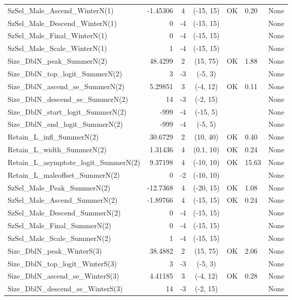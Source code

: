 \documentclass[12pt,]{article}
\begin{document}
\begin{landscape}
\begin{longtable}{lrcccll}
  SzSel\_Male\_Ascend\_WinterN(1) & -1.45306 & 4 & (-15, 15) & OK & 0.20 & None \\ 
  SzSel\_Male\_Descend\_WinterN(1) & 0 & -4 & (-15, 15) &  &  & None \\ 
  SzSel\_Male\_Final\_WinterN(1) & 0 & -4 & (-15, 15) &  &  & None \\ 
  SzSel\_Male\_Scale\_WinterN(1) & 1 & -4 & (-15, 15) &  &  & None \\ 
  Size\_DblN\_peak\_SummerN(2) & 48.4299 & 2 & (15, 75) & OK & 1.88 & None \\ 
  Size\_DblN\_top\_logit\_SummerN(2) & 3 & -3 & (-5, 3) &  &  & None \\ 
  Size\_DblN\_ascend\_se\_SummerN(2) & 5.29851 & 3 & (-4, 12) & OK & 0.11 & None \\ 
  Size\_DblN\_descend\_se\_SummerN(2) & 14 & -3 & (-2, 15) &  &  & None \\ 
  Size\_DblN\_start\_logit\_SummerN(2) & -999 & -4 & (-15, 5) &  &  & None \\ 
  Size\_DblN\_end\_logit\_SummerN(2) & -999 & -4 & (-5, 5) &  &  & None \\ 
  Retain\_L\_infl\_SummerN(2) & 30.6729 & 2 & (10, 40) & OK & 0.40 & None \\ 
  Retain\_L\_width\_SummerN(2) & 1.31436 & 4 & (0.1, 10) & OK & 0.24 & None \\ 
  Retain\_L\_asymptote\_logit\_SummerN(2) & 9.37198 & 4 & (-10, 10) & OK & 15.63 & None \\ 
  Retain\_L\_maleoffset\_SummerN(2) & 0 & -2 & (-10, 10) &  &  & None \\ 
  SzSel\_Male\_Peak\_SummerN(2) & -12.7368 & 4 & (-20, 15) & OK & 1.08 & None \\ 
  SzSel\_Male\_Ascend\_SummerN(2) & -1.89766 & 4 & (-15, 15) & OK & 0.24 & None \\ 
  SzSel\_Male\_Descend\_SummerN(2) & 0 & -4 & (-15, 15) &  &  & None \\ 
  SzSel\_Male\_Final\_SummerN(2) & 0 & -4 & (-15, 15) &  &  & None \\ 
  SzSel\_Male\_Scale\_SummerN(2) & 1 & -4 & (-15, 15) &  &  & None \\ 
  Size\_DblN\_peak\_WinterS(3) & 38.4882 & 2 & (15, 75) & OK & 2.06 & None \\ 
  Size\_DblN\_top\_logit\_WinterS(3) & 3 & -3 & (-5, 3) &  &  & None \\ 
  Size\_DblN\_ascend\_se\_WinterS(3) & 4.41185 & 3 & (-4, 12) & OK & 0.28 & None \\ 
  Size\_DblN\_descend\_se\_WinterS(3) & 14 & -3 & (-2, 15) &  &  & None \\ 

\end{longtable}
\end{landscape}
\end{document}
